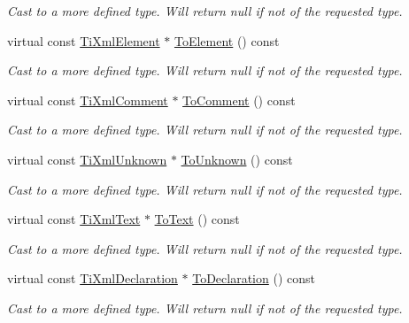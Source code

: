 \begin{DoxyCompactItemize}
\begin{DoxyCompactList}\small\item\em Cast to a more defined type. Will return null if not of the requested type. \end{DoxyCompactList}\item 
virtual const \hyperlink{class_ti_xml_element}{Ti\+Xml\+Element} $\ast$ \hyperlink{class_ti_xml_node_a72abed96dc9667ab9e0a2a275301bb1c}{To\+Element} () const 
\begin{DoxyCompactList}\small\item\em Cast to a more defined type. Will return null if not of the requested type. \end{DoxyCompactList}\item 
virtual const \hyperlink{class_ti_xml_comment}{Ti\+Xml\+Comment} $\ast$ \hyperlink{class_ti_xml_node_aa0a5086f9eaee910bbfdc7f975e26574}{To\+Comment} () const 
\begin{DoxyCompactList}\small\item\em Cast to a more defined type. Will return null if not of the requested type. \end{DoxyCompactList}\item 
virtual const \hyperlink{class_ti_xml_unknown}{Ti\+Xml\+Unknown} $\ast$ \hyperlink{class_ti_xml_node_afd7205cf31d7a376929f8a36930627a2}{To\+Unknown} () const 
\begin{DoxyCompactList}\small\item\em Cast to a more defined type. Will return null if not of the requested type. \end{DoxyCompactList}\item 
virtual const \hyperlink{class_ti_xml_text}{Ti\+Xml\+Text} $\ast$ \hyperlink{class_ti_xml_node_a95a46a52c525992d6b4ee08beb14cd69}{To\+Text} () const 
\begin{DoxyCompactList}\small\item\em Cast to a more defined type. Will return null if not of the requested type. \end{DoxyCompactList}\item 
virtual const \hyperlink{class_ti_xml_declaration}{Ti\+Xml\+Declaration} $\ast$ \hyperlink{class_ti_xml_node_a9f43e6984fc7d4afd6eb32714c6b7b72}{To\+Declaration} () const 
\begin{DoxyCompactList}\small\item\em Cast to a more defined type. Will return null if not of the requested type. \end{DoxyCompactList}\item 

\end{DoxyCompactItemize}
